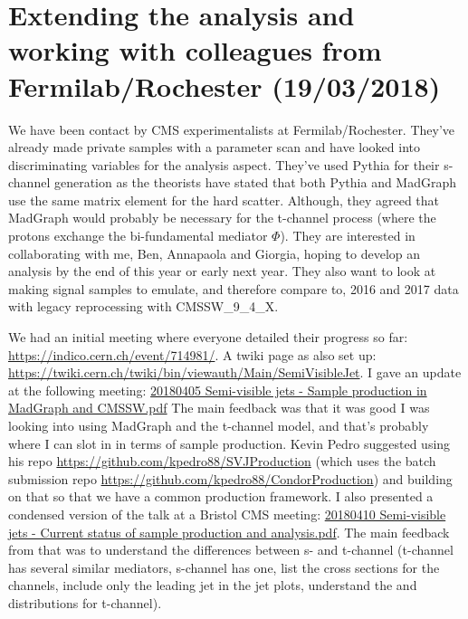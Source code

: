 

\section{Extending the analysis and working with colleagues from Fermilab/Rochester (19/03/2018)}

We have been contact by CMS experimentalists at Fermilab/Rochester. They've already made private samples with a parameter scan and have looked into discriminating variables for the analysis aspect. They've used Pythia for their s-channel generation as the theorists have stated that both Pythia and MadGraph use the same matrix element for the hard scatter. Although, they agreed that MadGraph would probably be necessary for the t-channel process (where the protons exchange the bi-fundamental mediator $\Phi$). They are interested in collaborating with me, Ben, Annapaola and Giorgia, hoping to develop an analysis by the end of this year or early next year. They also want to look at making signal samples to emulate, and therefore compare to, 2016 and 2017 data with legacy reprocessing with CMSSW\_9\_4\_X.

We had an initial meeting where everyone detailed their progress so far: \url{https://indico.cern.ch/event/714981/}. A twiki page as also set up: \url{https://twiki.cern.ch/twiki/bin/viewauth/Main/SemiVisibleJet}. I gave an update at the following meeting: \href{run:./sec35/20180405 Semi-visible jets - Sample production in MadGraph and CMSSW.pdf}{20180405 Semi-visible jets - Sample production in MadGraph and CMSSW.pdf} The main feedback was that it was good I was looking into using MadGraph and the t-channel model, and that's probably where I can slot in in terms of sample production. Kevin Pedro suggested using his repo \url{https://github.com/kpedro88/SVJProduction} (which uses the batch submission repo \url{https://github.com/kpedro88/CondorProduction}) and building on that so that we have a common production framework. I also presented a condensed version of the talk at a Bristol CMS meeting: \href{run:./sec35/20180410 Semi-visible jets - Current status of sample production and analysis.pdf}{20180410 Semi-visible jets - Current status of sample production and analysis.pdf}. The main feedback from that was to understand the differences between s- and t-channel (t-channel has several similar mediators, s-channel has one, list the cross sections for the channels, include only the leading jet \pt in the jet \pt plots, understand the \njet and \etmiss distributions for t-channel).


